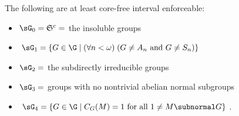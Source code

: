 \begin{frame}[label=IEPropsWithLemmaComment]{}
The following are at least core-free interval enforceable:
\vskip5mm
\begin{itemize}
\item $\sG_0 = \mathfrak{S}^c = $ the insoluble groups
\vskip2mm
\item $\sG_1 =\{G\in \G \mid (\forall n<\omega) \; (G \neq A_n \text{ and }  G\neq S_n) \}$
\vskip2mm
\item $\sG_2 = $ the subdirectly irreducible groups
\vskip2mm
\item $\sG_3 = $ groups with no nontrivial abelian normal subgroups
\vskip2mm
\item $\sG_4 = \{G\in \G \mid C_G(M) = 1 \text{ for all } 1\neq M\subnormal G\}$.
\end{itemize}
\vskip5mm
\end{frame}



